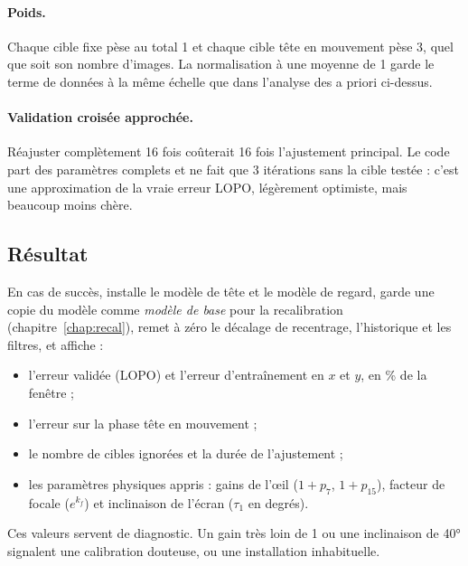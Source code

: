 \paragraph{Poids.} Chaque cible fixe pèse au total 1 et chaque cible tête en mouvement pèse 3, quel que soit son nombre d'images. La normalisation à une moyenne de 1 garde le terme de données à la même échelle que dans l'analyse des a priori ci-dessus.

\paragraph{Validation croisée approchée.} Réajuster complètement 16 fois coûterait 16 fois l'ajustement principal. Le code part des paramètres complets et ne fait que 3 itérations sans la cible testée : c'est une approximation de la vraie erreur LOPO, légèrement optimiste, mais beaucoup moins chère.

\subsection{Résultat}

En cas de succès,  installe le modèle de tête et le modèle de regard, garde une copie du modèle comme \emph{modèle de base} pour la recalibration (chapitre~\ref{chap:recal}), remet à zéro le décalage de recentrage, l'historique et les filtres, et affiche :
\begin{itemize}
  \item l'erreur validée (LOPO) et l'erreur d'entraînement en $x$ et $y$, en \% de la fenêtre ;
  \item l'erreur sur la phase tête en mouvement ;
  \item le nombre de cibles ignorées et la durée de l'ajustement ;
  \item les paramètres physiques appris : gains de l'œil ($1 + p_7$, $1 + p_{15}$), facteur de focale ($e^{k_f}$) et inclinaison de l'écran ($\tau_1$ en degrés).
\end{itemize}
Ces valeurs servent de diagnostic. Un gain très loin de 1 ou une inclinaison de \ang{40} signalent une calibration douteuse, ou une installation inhabituelle.
